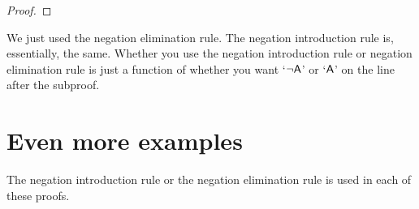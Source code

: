\begin{proof}
	 \pr{}	
	 \pr{}
	\open
		\as{}
	\close
\end{proof}

We just used the negation elimination rule. The negation introduction rule is, essentially, the same. Whether you use the negation introduction rule or negation elimination rule is just a function of whether you want `${\neg} \mathsf{A}$' or `$\mathsf{A}$' on the line after the subproof.


\newpage

\section{Even more examples}

The negation introduction rule or the negation elimination rule is used in each of these proofs.

